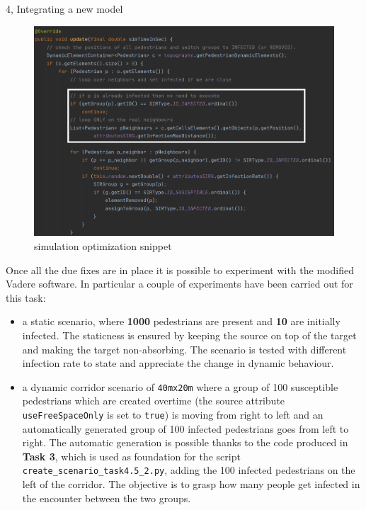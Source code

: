 \documentclass[10pt,a4paper]{article}
\begin{document}
\begin{task}{4, Integrating a new model}
\begin{itemize}
\begin{figure}[H]
    \includegraphics[scale=0.7]{images/simulation_optimization_snippet.png}
    \caption{simulation optimization snippet}
    \label{fig:optim-snippet}
\end{figure}
\end{itemize}

Once all the due fixes are in place it is possible to experiment with the modified Vadere software. In particular a couple of experiments have been carried out for this task:
\begin{itemize}
    \item a static scenario, where \textbf{1000} pedestrians are present and \textbf{10} are initially infected. The staticness is ensured by keeping the source on top of the target and making the target non-absorbing. The scenario is tested with different infection rate to state and appreciate the change in dynamic behaviour.
    \item a dynamic corridor scenario of \texttt{40mx20m} where a group of 100 susceptible pedestrians which are created overtime (the source attribute \texttt{useFreeSpaceOnly} is set to \texttt{true}) is moving from right to left and an automatically generated group of 100 infected pedestrians goes from left to right. The automatic generation is possible thanks to the code produced in \textbf{Task 3}, which is used as foundation for the script \texttt{create\_scenario\_task4.5\_2.py}, adding the 100 infected pedestrians on the left of the corridor. The objective is to grasp how many people get infected in the encounter between the two groups. 
\end{itemize}


\end{task}
\end{document}
